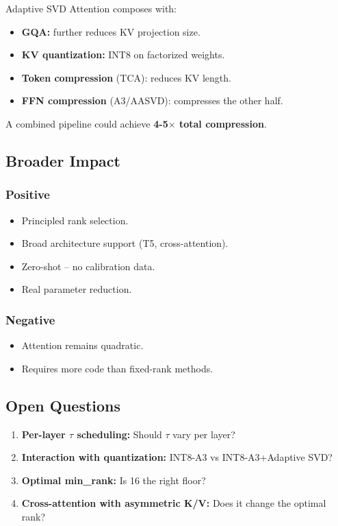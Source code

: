 Adaptive SVD Attention composes with:

\begin{itemize}
\item \textbf{GQA:} further reduces KV projection size.
\item \textbf{KV quantization:} INT8 on factorized weights.
\item \textbf{Token compression} (TCA): reduces KV length.
\item \textbf{FFN compression} (A3/AASVD): compresses the other half.

\end{itemize}
A combined pipeline could achieve \textbf{4-5$\times$ total compression}.

\subsection{Broader Impact}

\subsubsection{Positive}
\begin{itemize}
\item Principled rank selection.
\item Broad architecture support (T5, cross-attention).
\item Zero-shot -- no calibration data.
\item Real parameter reduction.

\end{itemize}
\subsubsection{Negative}
\begin{itemize}
\item Attention remains quadratic.
\item Requires more code than fixed-rank methods.

\end{itemize}
\subsection{Open Questions}

\begin{enumerate}
\item \textbf{Per-layer $\tau$ scheduling:} Should $\tau$ vary per layer?
\item \textbf{Interaction with quantization:} INT8-A3 vs INT8-A3+Adaptive SVD?
\item \textbf{Optimal min\_rank:} Is 16 the right floor?
\item \textbf{Cross-attention with asymmetric K/V:} Does it change the optimal rank?

\end{enumerate}
